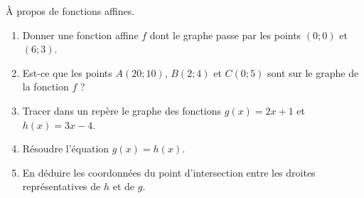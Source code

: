 
\begin{exercice}\label{exosmath-0671}

    À propos de fonctions affines.
    \begin{enumerate}
        \item
            Donner une fonction affine \( f\) dont le graphe passe par les points \( (0;0)\) et \( (6;3)\).
        \item
            Est-ce que les points \( A(20;10)\), \( B(2;4)\) et \( C(0;5)\) sont sur le graphe de la fonction \( f\) ?
        \item
            Tracer dans un repère le graphe des fonctions \( g(x)=2x+1\) et \( h(x)=3x-4\).
        \item
            Résoudre l'équation \( g(x)=h(x)\).
        \item
            En déduire les coordonnées du point d'intersection entre les droites représentatives de \( h\) et de \( g\).
    \end{enumerate}

\end{exercice}
